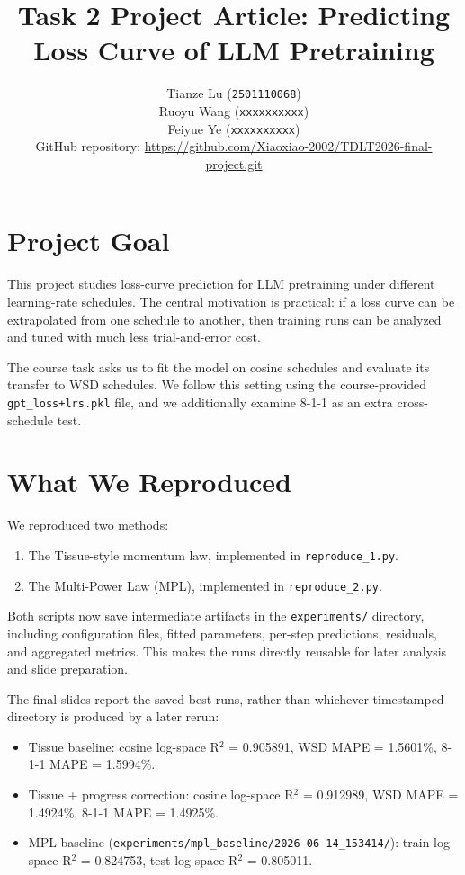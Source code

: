 ﻿\documentclass[11pt]{article}
\title{Task 2 Project Article: Predicting Loss Curve of LLM Pretraining}
\author{%
Tianze Lu (\texttt{2501110068}) \\
Ruoyu Wang (\texttt{xxxxxxxxxx}) \\
Feiyue Ye (\texttt{xxxxxxxxxx})\\[0.75em]
\normalsize GitHub repository: \href{https://github.com/Xiaoxiao-2002/TDLT2026-final-project.git}{https://github.com/Xiaoxiao-2002/TDLT2026-final-project.git}
}
\date{}
\begin{document}
\maketitle

\section{Project Goal}

This project studies loss-curve prediction for LLM pretraining under different learning-rate schedules. The central motivation is practical: if a loss curve can be extrapolated from one schedule to another, then training runs can be analyzed and tuned with much less trial-and-error cost.

The course task asks us to fit the model on cosine schedules and evaluate its transfer to WSD schedules. We follow this setting using the course-provided \texttt{gpt\_loss+lrs.pkl} file, and we additionally examine 8-1-1 as an extra cross-schedule test.

\section{What We Reproduced}

We reproduced two methods:

\begin{enumerate}
  \item The Tissue-style momentum law, implemented in \texttt{reproduce\_1.py}.
  \item The Multi-Power Law (MPL), implemented in \texttt{reproduce\_2.py}.
\end{enumerate}

Both scripts now save intermediate artifacts in the \texttt{experiments/} directory, including configuration files, fitted parameters, per-step predictions, residuals, and aggregated metrics. This makes the runs directly reusable for later analysis and slide preparation.

The final slides report the saved best runs, rather than whichever timestamped directory is produced by a later rerun:

\begin{itemize}
  \item Tissue baseline: cosine log-space R$^2$ = 0.905891, WSD MAPE = 1.5601\%, 8-1-1 MAPE = 1.5994\%.
  \item Tissue + progress correction: cosine log-space R$^2$ = 0.912989, WSD MAPE = 1.4924\%, 8-1-1 MAPE = 1.4925\%.
  \item MPL baseline (\texttt{experiments/mpl\_baseline/2026-06-14\_153414/}): train log-space R$^2$ = 0.824753, test log-space R$^2$ = 0.805011.
\end{itemize}
\end{document}
